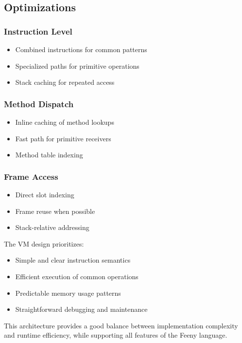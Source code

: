 \documentclass[12pt, a4paper]{article}
\begin{document}
\subsection{Optimizations}

\subsubsection{Instruction Level}
\begin{itemize}
\item Combined instructions for common patterns
\item Specialized paths for primitive operations
\item Stack caching for repeated access
\end{itemize}

\subsubsection{Method Dispatch}
\begin{itemize}
\item Inline caching of method lookups
\item Fast path for primitive receivers
\item Method table indexing
\end{itemize}

\subsubsection{Frame Access}
\begin{itemize}
\item Direct slot indexing
\item Frame reuse when possible
\item Stack-relative addressing
\end{itemize}

The VM design prioritizes:
\begin{itemize}
\item Simple and clear instruction semantics
\item Efficient execution of common operations
\item Predictable memory usage patterns
\item Straightforward debugging and maintenance
\end{itemize}

This architecture provides a good balance between implementation complexity and runtime efficiency, while supporting all features of the Feeny language.
\end{document}
